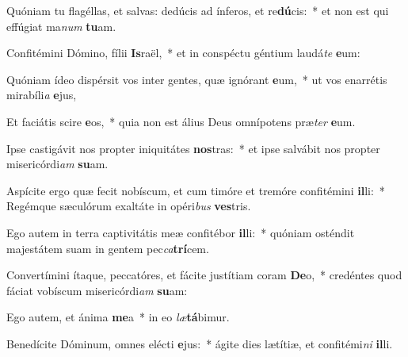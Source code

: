 \item Quóniam tu flagéllas, et salvas: dedúcis ad ínferos, et re\textbf{dú}cis:~* et non est qui effúgiat ma\textit{num} \textbf{tu}am.
\item Confitémini Dómino, fílii \textbf{Is}raël,~* et in conspéctu géntium laudá\textit{te} \textbf{e}um:
\item Quóniam ídeo dispérsit vos inter gentes, quæ ignórant \textbf{e}um,~* ut vos enarrétis mirabíli\textit{a} \textbf{e}jus,
\item Et faciátis scire \textbf{e}os,~* quia non est álius Deus omnípotens præ\textit{ter} \textbf{e}um.
\item Ipse castigávit nos propter iniquitátes \textbf{nos}tras:~* et ipse salvábit nos propter misericórdi\textit{am} \textbf{su}am.
\item Aspícite ergo quæ fecit nobíscum, et cum timóre et tremóre confitémini \textbf{il}li:~* Regémque sæculórum exaltáte in opéri\textit{bus} \textbf{ves}tris.
\item Ego autem in terra captivitátis meæ confitébor \textbf{il}li:~* quóniam osténdit majestátem suam in gentem pec\textit{ca}\textbf{trí}cem.
\item Convertímini ítaque, peccatóres, et fácite justítiam coram \textbf{De}o,~* credéntes quod fáciat vobíscum misericórdi\textit{am} \textbf{su}am:
\item Ego autem, et ánima \textbf{me}a~* in eo \textit{læ}\textbf{tá}bimur.
\item Benedícite Dóminum, omnes elécti \textbf{e}jus:~* ágite dies lætítiæ, et confitémi\textit{ni} \textbf{il}li.
